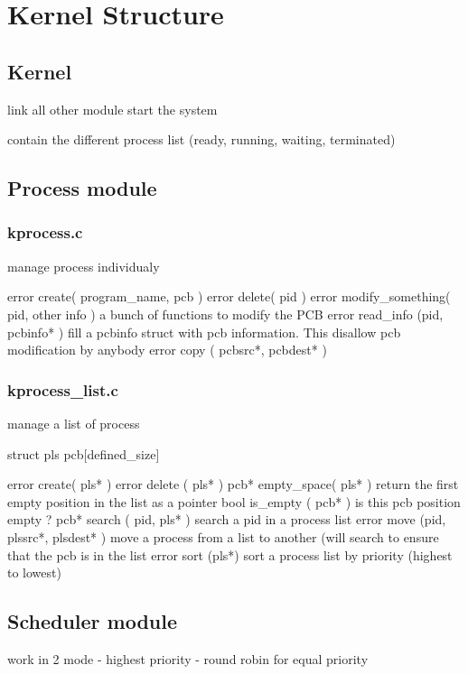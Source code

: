 \chapter{Kernel Structure}

\section{Kernel}

link all other module
start the system

contain the different process list (ready, running, waiting, terminated)

\section{Process module}

\subsection{kprocess.c}

manage process individualy

error create( program\_name, pcb )
error delete( pid )
error modify\_something( pid, other info ) a bunch of functions to modify the PCB
error read\_info (pid, pcbinfo* ) fill a pcbinfo  struct with pcb information. This disallow pcb modification by anybody
error copy ( pcbsrc*, pcbdest* )

\subsection{kprocess\_list.c}

manage a list of process

struct pls pcb[defined\_size]

error create( pls* ) 
error delete ( pls* )
pcb* empty\_space( pls* ) return the first empty position in the list as a pointer
bool is\_empty ( pcb* ) is this pcb position empty ?
pcb* search ( pid, pls* ) search a pid in a process list
error move (pid, plssrc*, plsdest* ) move a process from a list to another (will search to ensure that the pcb is in the list
error sort (pls*) sort a process list by priority (highest to lowest)

\section{Scheduler module}

work in 2 mode
- highest priority
- round robin for equal priority

